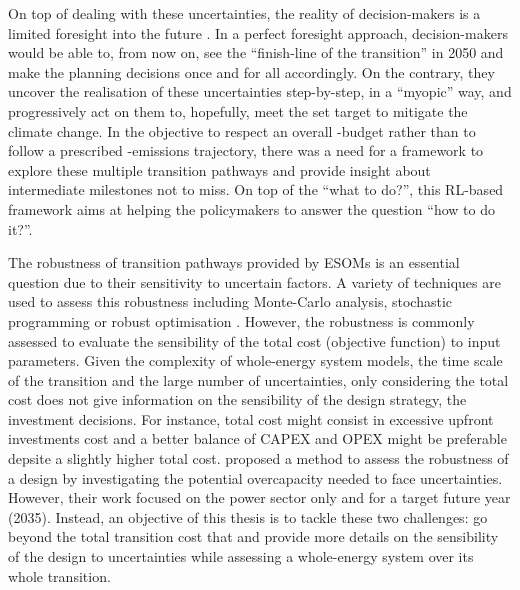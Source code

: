 On top of dealing with these uncertainties, the reality of decision-makers is a limited foresight into the future \cite{poncelet2016myopic}. In a perfect foresight approach, decision-makers would be able to, from now on, see the ``finish-line of the transition'' in 2050 and make the planning decisions once and for all accordingly. On the contrary, they uncover the realisation of these uncertainties step-by-step, in a ``myopic'' way, and progressively act on them to, hopefully, meet the set target to mitigate the climate change. In the objective to respect an overall -budget rather than to follow a prescribed -emissions trajectory, there was a need for a framework to explore these multiple transition pathways and provide insight about intermediate milestones not to miss. On top of the ``what to do?'', this \gls{RL}-based framework aims at helping the policymakers to answer the  question ``how to do it?''.

The robustness of transition pathways provided by ESOMs is an essential question due to their sensitivity to uncertain factors. A variety of techniques are used to assess this robustness including Monte-Carlo analysis, stochastic programming or robust optimisation \cite{yue2018review}. However, the robustness is commonly assessed to evaluate the sensibility of the total cost (objective function) to input parameters.  Given the complexity of whole-energy system models, the time scale of the transition and the large number of uncertainties, only considering the total cost does not give information on the sensibility of the design strategy, \ie the investment decisions. For instance, total cost might consist in excessive upfront investments cost and a better balance of \gls{CAPEX} and \gls{OPEX} might be preferable depsite a slightly higher total cost. \citet{moret2020overcapacity} proposed a method to assess the robustness of a design by investigating the potential overcapacity needed to face uncertainties. However, their work focused on the power sector only and for a target future year (2035).  Instead, an objective of this thesis is to tackle these two challenges: go beyond the total transition cost that and provide more details on the sensibility of the design to uncertainties while assessing a whole-energy system over its whole transition.\\

